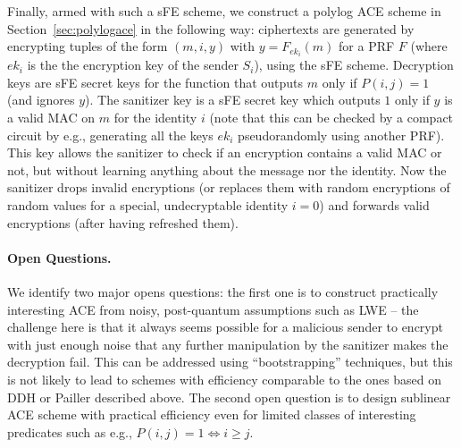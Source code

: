 \documentclass{llncs}
\begin{document}
Finally, armed with such a sFE scheme, we construct a polylog ACE scheme in Section~\ref{sec:polylogace} in the following way: ciphertexts are generated by encrypting tuples of the form $(m,i,y)$ with $y=F_{ek_i}(m)$ for a PRF $F$ (where $ek_i$ is the the encryption key of the sender $S_i$), using the sFE scheme. Decryption keys are sFE secret keys for the function that outputs $m$ only if $P(i,j)=1$ (and ignores $y$). The sanitizer key is a sFE secret key which outputs $1$ only if $y$ is a valid MAC on $m$ for the identity $i$ (note that this can be checked by a compact circuit by e.g., generating all the keys $ek_i$ pseudorandomly using another PRF). This key allows the sanitizer to check if an encryption contains a valid MAC or not, but without learning anything about the message nor the identity. Now the sanitizer drops invalid encryptions (or replaces them with random encryptions of random values for a special, undecryptable identity $i=0$) and forwards valid encryptions (after having refreshed them). 



\paragraph{Open Questions.} We identify two major opens questions: the first one is to construct practically interesting ACE from noisy, post-quantum assumptions such as LWE -- the challenge here is that it always seems possible for a malicious sender to encrypt with just enough noise that any further manipulation by the sanitizer makes the decryption fail. This can be addressed using ``bootstrapping'' techniques, but this is not likely to lead to schemes with efficiency comparable to the ones based on DDH or Pailler described above. The second open question is to design sublinear ACE scheme with practical efficiency even for limited classes of interesting predicates such as e.g., $P(i,j)=1 \Leftrightarrow i \geq j$.


 
\end{document}
